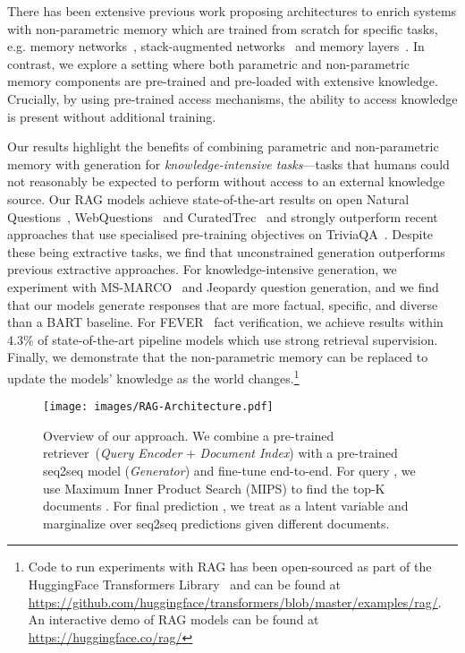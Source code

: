 \documentclass{article}
\begin{document}
There has been extensive previous work proposing architectures to enrich systems with non-parametric memory which are trained from scratch for specific tasks, e.g. memory networks~\cite{weston2015memory,sukhbaatar2015end}, stack-augmented networks~\cite{joulin2015} and memory layers~\cite{lample_large_2019}. In contrast, we explore a setting where both parametric and non-parametric memory components are pre-trained and pre-loaded with extensive knowledge. Crucially, by using pre-trained access mechanisms, the ability to access knowledge is present without additional training. 

Our results highlight the benefits of combining  parametric and non-parametric memory with generation for \emph{knowledge-intensive tasks}---tasks that humans could not reasonably be expected to perform without access to an external knowledge source. 
Our RAG models achieve state-of-the-art results on open Natural Questions~\cite{kwiatkowski_natural_2019}, WebQuestions~\cite{berant_semantic_2013} and CuratedTrec~\cite{baudivs2015modeling} and strongly outperform recent approaches that use specialised pre-training objectives on TriviaQA~\cite{joshi_triviaqa:_2017}. Despite these being extractive tasks, we find that unconstrained generation outperforms previous extractive approaches. For knowledge-intensive generation, we experiment with MS-MARCO~\cite{bajaj_ms_2016} and Jeopardy question generation, and we find that our models generate responses that are more factual, specific, and diverse than a BART baseline. For FEVER~\cite{thorne-etal-2018-fever} fact verification, we achieve results within 4.3\% of state-of-the-art pipeline models which use strong retrieval supervision.
Finally, we demonstrate that the non-parametric memory can be replaced
to update the models' knowledge as the world changes.\footnote{Code to run experiments with RAG has been open-sourced as part of the HuggingFace Transformers Library~\cite{Wolf2019HuggingFacesTS} and can be found at \url{https://github.com/huggingface/transformers/blob/master/examples/rag/}. An interactive demo of RAG models can be found at \url{https://huggingface.co/rag/}}

 
\begin{figure}[t]
\centering
\texttt{[image: images/RAG-Architecture.pdf]}
\caption{Overview of our approach. We combine a pre-trained retriever~(\emph{Query Encoder} + \emph{Document Index}) with a pre-trained seq2seq model (\emph{Generator}) and fine-tune end-to-end. For  query , we use Maximum Inner Product Search (MIPS) to find the top-K documents . For final prediction , we treat  as a latent variable and marginalize over seq2seq predictions given different documents.}
\label{fig:fig_1}
\end{figure}
\end{document}
